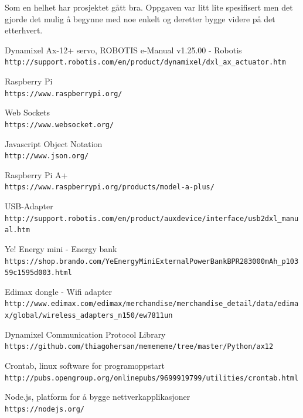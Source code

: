 \documentclass[12pt]{report}
\begin{document}
Som en helhet har prosjektet gått bra. Oppgaven var litt lite spesifisert men det gjorde det mulig å begynne med noe enkelt og deretter bygge videre på det etterhvert.

\renewcommand{\bibname}{Referanser}

\begin{thebibliography}{3}
	Dynamixel Ax-12+ servo, ROBOTIS e-Manual v1.25.00 - Robotis
	\\\texttt{http://support.robotis.com/en/product/dynamixel/dxl\_ax\_actuator.htm}
 
	Raspberry Pi
	\\\texttt{https://www.raspberrypi.org/}
 
	Web Sockets
	\\\texttt{https://www.websocket.org/}

	Javascript Object Notation
	\\\texttt{http://www.json.org/}

	Raspberry Pi A+
	\\\texttt{https://www.raspberrypi.org/products/model-a-plus/}
	
	USB-Adapter
	\\\texttt{http://support.robotis.com/en/product/auxdevice/interface/usb2dxl\_manual.htm}
	
	Ye! Energy mini - Energy bank
	\\\texttt{https://shop.brando.com/Ye\-Energy\-Mini\-External\-Power\-Bank\-BPR28\-3000mAh\_p10359c1595d003.html}
	
	Edimax dongle - Wifi adapter
	\\\texttt{http://www.edimax.com/edimax/merchandise/merchandise\_detail/data/edimax/global/wireless\_adapters\_n150/ew\-7811un}
	
	Dynamixel Communication Protocol Library
	\\\texttt{https://github.com/thiagohersan/memememe/tree/master/Python/ax12}

	Crontab, linux software for programoppstart 
	\\\texttt{http://pubs.opengroup.org/onlinepubs/9699919799/utilities/crontab.html}
	
	Node.js, platform for å bygge nettverkapplikasjoner
	\\\texttt{https://nodejs.org/}


\end{thebibliography}
\end{document}
